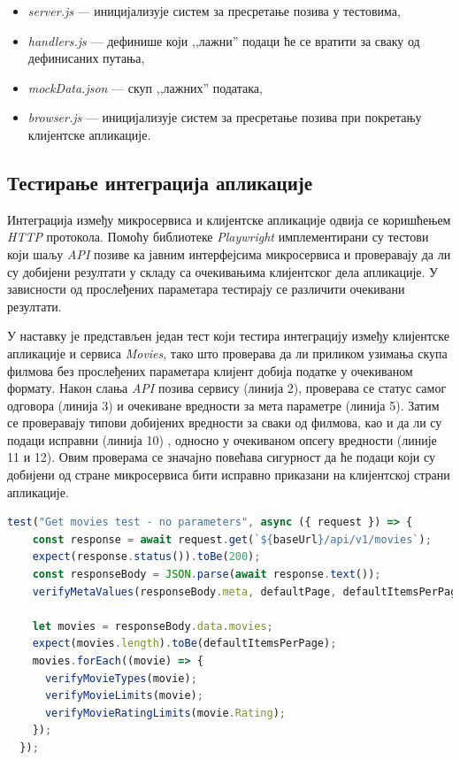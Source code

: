 \documentclass[12pt,oneside]{memoir}
\begin{document}
\begin{itemize}
\item \textit{server.js} --- иницијализује систем за пресретање позива у тестовима,
\item \textit{handlers.js} --- дефинише који ,,лажни” подаци ће се вратити за сваку од дефинисаних путања,
\item \textit{mockData.json} --- скуп ,,лажних” података,
\item \textit{browser.js} --- иницијализује систем за пресретање позива при покретању клијентске апликације.
\end{itemize}


\subsection{Тестирање интеграција апликације}

Интеграција између микросервиса и клијентске апликације одвија се коришћењем \textit{HTTP} протокола. Помоћу библиотеке \textit{Playwright} имплементирани су тестови који шаљу \textit{API} позиве ка јавним интерфејсима микросервиса и проверавају да ли су добијени резултати у складу са очекивањима клијентског дела апликације. У зависности од прослеђених параметара тестирају се различити очекивани резултати.

У наставку је представљен један тест који тестира интеграцију између клијентске апликације и сервиса \textit{Movies}, тако што проверава да ли приликом узимања скупа филмова без прослеђених параметара клијент добија податке у очекиваном формату. Након слања \textit{API} позива сервису (линија 2), проверава се статус самог одговора (линија 3) и очекиване вредности за мета параметре (линија 5). Затим се проверавају типови добијених вредности за сваки од филмова, као и да ли су подаци исправни  (линија 10) , односно у очекиваном опсегу вредности (линије 11 и 12). Овим проверама се значајно повећава сигурност да ће подаци који су добијени од стране микросервиса бити исправно приказани на клијентској страни апликације.

\newpage

\begin{lstlisting}[caption= Тест интеграције сервиса \textit{Movies} и клијентске апликације, 
language=Javascript,
label={lst:integrationTest},
frame=single]
test("Get movies test - no parameters", async ({ request }) => {
    const response = await request.get(`${baseUrl}/api/v1/movies`);
    expect(response.status()).toBe(200);
    const responseBody = JSON.parse(await response.text());
    verifyMetaValues(responseBody.meta, defaultPage, defaultItemsPerPage);

    let movies = responseBody.data.movies;
    expect(movies.length).toBe(defaultItemsPerPage);
    movies.forEach((movie) => {
      verifyMovieTypes(movie);
      verifyMovieLimits(movie);
      verifyMovieRatingLimits(movie.Rating);
    });
  });
\end{lstlisting}
\end{document}
